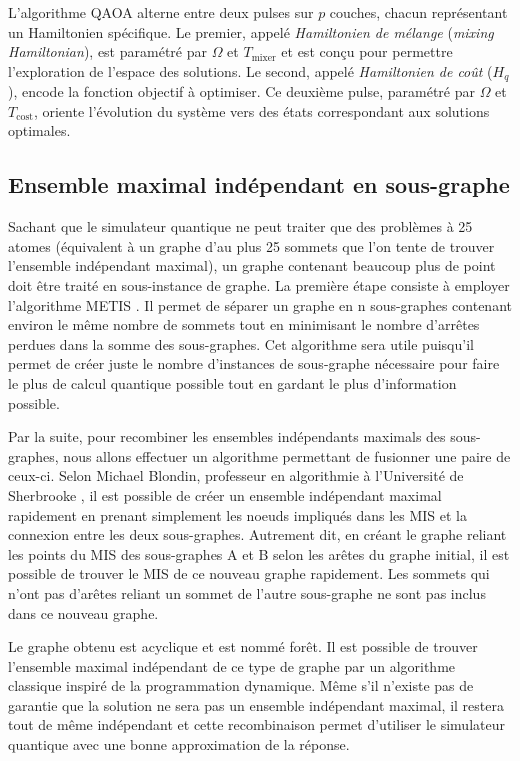\documentclass[11pt]{article}
\begin{document}
 L'algorithme QAOA alterne entre deux pulses sur \( p \) couches, chacun représentant un Hamiltonien spécifique. Le premier, appelé \textit{Hamiltonien de mélange} (\textit{mixing Hamiltonian}), est paramétré par \( \Omega \) et \( T_{\text{mixer}} \) et est conçu pour permettre l'exploration de l'espace des solutions. Le second, appelé \textit{Hamiltonien de coût} (\( H_q \)), encode la fonction objectif à optimiser. Ce deuxième pulse, paramétré par \( \Omega \) et \( T_{\text{cost}} \), oriente l'évolution du système vers des états correspondant aux solutions optimales.


\subsection{Ensemble maximal indépendant en sous-graphe}
Sachant que le simulateur quantique ne peut traiter que des problèmes à 25 atomes (équivalent à un graphe d'au plus 25 sommets que l'on tente de trouver l'ensemble indépendant maximal), un graphe contenant beaucoup plus de point doit être traité en sous-instance de graphe. La première étape consiste à employer l'algorithme METIS \cite{karypis_multilevelk-way_1998}. Il permet de séparer un graphe en n sous-graphes contenant environ le même nombre de sommets tout en minimisant le nombre d'arrêtes perdues dans la somme des sous-graphes. Cet algorithme sera utile puisqu'il permet de créer juste le nombre d'instances de sous-graphe nécessaire pour faire le plus de calcul quantique possible tout en gardant le plus d'information possible. 

Par la suite, pour recombiner les ensembles indépendants maximals des sous-graphes, nous allons effectuer un algorithme permettant de fusionner une paire de ceux-ci. Selon Michael Blondin, professeur en algorithmie à l'Université de Sherbrooke \cite{blondin_entretien_2024}, il est possible de créer un ensemble indépendant maximal rapidement en prenant simplement les noeuds impliqués dans les MIS et la connexion entre les deux sous-graphes. Autrement dit, en créant le graphe reliant les points du MIS des sous-graphes A et B selon les arêtes du graphe initial, il est possible de trouver le MIS de ce nouveau graphe rapidement. Les sommets qui n'ont pas d'arêtes reliant un sommet de l'autre sous-graphe ne sont pas inclus dans ce nouveau graphe.

Le graphe obtenu est acyclique et est nommé forêt. Il est possible de trouver l'ensemble maximal indépendant de ce type de graphe par un algorithme classique inspiré de la programmation dynamique. Même s'il n'existe pas de garantie que la solution ne sera pas un ensemble indépendant maximal, il restera tout de même indépendant et cette recombinaison permet d'utiliser le simulateur quantique avec une bonne approximation de la réponse.
\end{document}
